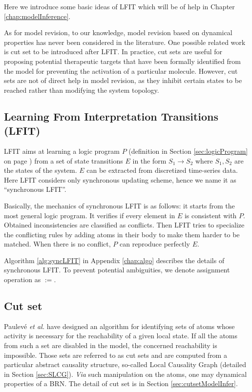 Here we introduce some basic ideas of LFIT which will be of help in Chapter \ref{chap:modelInference}.

As for model revision, to our knowledge, model revision based on dynamical properties has never been considered in the literature.
One possible related work is cut set to be introduced after LFIT.
In practice, cut sets are useful for proposing potential therapeutic targets that have been formally identified from the model for preventing the activation of a particular molecule.
However, cut sets are not of direct help in model revision, as they inhibit certain states to be reached rather than modifying the system topology.

\subsection{Learning From Interpretation Transitions (LFIT)}\label{sec:lfitSyn}
LFIT aims at learning a logic program $P$ (definition in Section \ref{sec:logicProgram} on page \pageref{sec:logicProgram}) from a set of state transitions $E$ in the form $S_1\to S_2$ where $S_1,S_2$ are the states of the system.
$E$ can be extracted from discretized time-series data.
Here LFIT considers only synchronous updating scheme, hence we name it as ``synchronous LFIT''.

Basically, the mechanics of synchronous LFIT is as follows: it starts from the most general logic program.
It verifies if every element in $E$ is consistent with $P$.
Obtained inconsistencies are classified as conflicts.
Then LFIT tries to specialize the conflicting rules by adding atoms in their body to make them harder to be matched.
When there is no conflict, $P$ can reproduce perfectly $E$.

Algorithm \ref{alg:syncLFIT} in Appendix \ref{chap:algo} describes the details of synchronous LFIT.
To prevent potential ambiguities, we denote assignment operation as $:=$. 


\subsection{Cut set}\label{sec:cutset}

Paulev\'e \textit{et al.} \cite{PAK13-CAV} have designed an algorithm for identifying sets of atoms whose activity is necessary for the reachability of a given local state. 
If all the atoms from such a set are disabled in the model, the concerned reachability is impossible. 
Those sets are referred to as cut sets and are computed from a particular abstract causality structure, so-called Local Causality Graph (detailed in Section \ref{sec:SLCG}).
\textit{Via} such manipulation on the atoms, one may dynamical properties of a BRN.
The detail of cut set is in Section \ref{sec:cutsetModelInfer}. 

